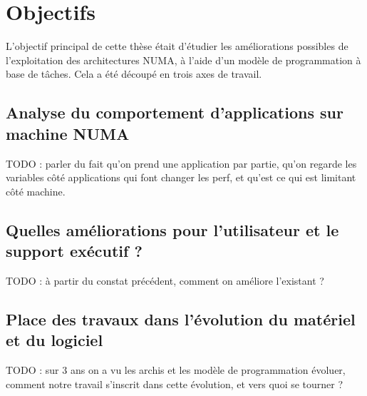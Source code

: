 \section{Objectifs}\label{sec:intro:objectives}

L'objectif principal de cette thèse était d'étudier les améliorations possibles de l'exploitation des architectures NUMA, à l'aide d'un modèle de programmation à base de tâches.
Cela a été découpé en trois axes de travail.


\subsection{Analyse du comportement d'applications sur machine NUMA}

TODO : parler du fait qu'on prend une application par partie, qu'on regarde les variables côté applications qui font changer les perf, et qu'est ce qui est limitant côté machine.

\subsection{Quelles améliorations pour l'utilisateur et le support exécutif ?}

TODO : à partir du constat précédent, comment on améliore l'existant ?

\subsection{Place des travaux dans l'évolution du matériel et du logiciel}

TODO : sur 3 ans on a vu les archis et les modèle de programmation évoluer, comment notre travail s'inscrit dans cette évolution, et vers quoi se tourner ?

